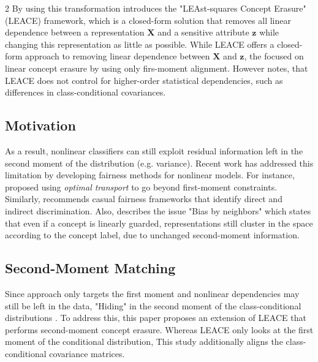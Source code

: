 \documentclass[ecta,nameyear,final]{econsocart}
\numberwithin{equation}{section}
\theoremstyle{plain}
\theoremstyle{definition}
\begin{document}
\begin{multicols}{2}
\newline \newline
By using this transformation \cite{Belrose2023} introduces the "LEAst-squares Concept Erasure" (LEACE) framework, which is a closed-form solution that removes all linear dependence between a representation $\mathbf{X}$ and a sensitive attribute $\mathbf{z}$ while changing this representation as little as possible.
\newline \newline
While LEACE offers a closed-form approach to removing linear dependence between $\mathbf{X}$ and $\mathbf{z}$, the focused on linear concept erasure by using only firs-moment alignment. However \cite{Belrose2023} notes, that LEACE does not control for higher-order statistical dependencies, such as differences in class-conditional covariances.
\subsection{Motivation}
As a result, nonlinear classifiers can still exploit residual information left in the second moment
of the distribution (e.g. variance). 
\newline \newline
Recent work has addressed this limitation by developing
fairness methods for nonlinear models. For instance, \cite{Oneto2020} proposed using \emph{optimal transport} to go beyond first-moment constraints. Similarly, \cite{Wu2020AchievingCF} recommends casual fairness frameworks that identify direct and indirect discrimination. Also, \cite{gonen-goldberg-2019-lipstick} describes the issue "Bias by neighbors" which states that even if a concept is linearly guarded, representations still cluster in the space according to the concept label, due to unchanged second-moment information.
\subsection{Second-Moment Matching}
Since \cite{Belrose2023} approach only targets the first moment and nonlinear dependencies may still be left in the data, "Hiding" in the second moment of the class-conditional distributions \citep{Shashwat2024}.
\newline \newline
To address this, this paper proposes an extension of LEACE that performs second-moment concept erasure. Whereas LEACE only looks at the first moment of the conditional distribution, This study additionally aligns the class-conditional covariance matrices.
\newline


\end{multicols}
\end{document}
